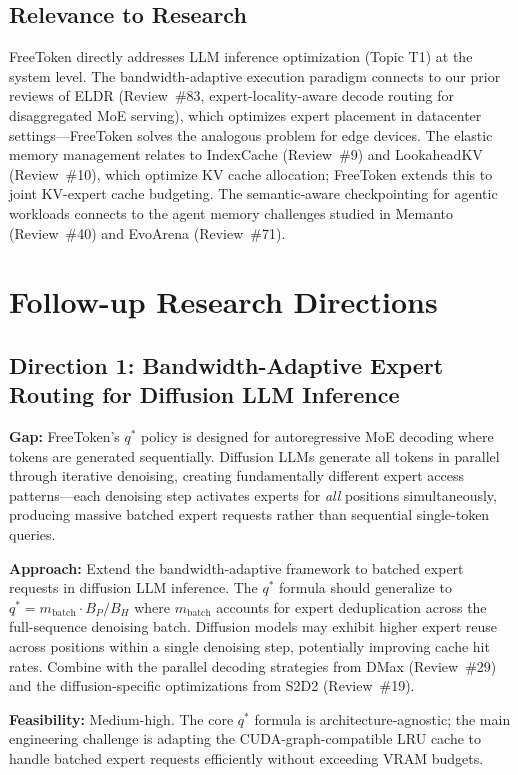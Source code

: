 \documentclass[11pt,a4paper]{article}
\begin{document}
\subsection{Relevance to Research}
FreeToken directly addresses LLM inference optimization (Topic T1) at the system level. The bandwidth-adaptive execution paradigm connects to our prior reviews of ELDR (Review~\#83, expert-locality-aware decode routing for disaggregated MoE serving), which optimizes expert placement in datacenter settings---FreeToken solves the analogous problem for edge devices. The elastic memory management relates to IndexCache (Review~\#9) and LookaheadKV (Review~\#10), which optimize KV cache allocation; FreeToken extends this to joint KV-expert cache budgeting. The semantic-aware checkpointing for agentic workloads connects to the agent memory challenges studied in Memanto (Review~\#40) and EvoArena (Review~\#71).

\section{Follow-up Research Directions}

\subsection{Direction 1: Bandwidth-Adaptive Expert Routing for Diffusion LLM Inference}
\textbf{Gap:} FreeToken's $q^*$ policy is designed for autoregressive MoE decoding where tokens are generated sequentially. Diffusion LLMs generate all tokens in parallel through iterative denoising, creating fundamentally different expert access patterns---each denoising step activates experts for \emph{all} positions simultaneously, producing massive batched expert requests rather than sequential single-token queries.

\textbf{Approach:} Extend the bandwidth-adaptive framework to batched expert requests in diffusion LLM inference. The $q^*$ formula should generalize to $q^* = m_{\text{batch}} \cdot B_P / B_H$ where $m_{\text{batch}}$ accounts for expert deduplication across the full-sequence denoising batch. Diffusion models may exhibit higher expert reuse across positions within a single denoising step, potentially improving cache hit rates. Combine with the parallel decoding strategies from DMax (Review~\#29) and the diffusion-specific optimizations from S2D2 (Review~\#19).

\textbf{Feasibility:} Medium-high. The core $q^*$ formula is architecture-agnostic; the main engineering challenge is adapting the CUDA-graph-compatible LRU cache to handle batched expert requests efficiently without exceeding VRAM budgets.
\end{document}
